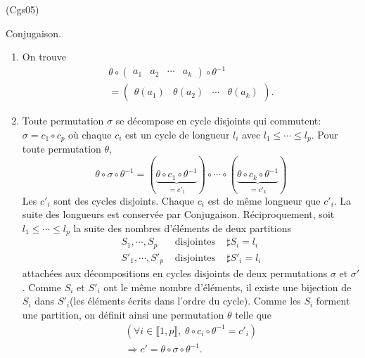 \begin{tiny}(Cgs05)\end{tiny} Conjugaison.
\begin{enumerate}
  \item On trouve 
\begin{multline*}
  \theta \circ 
\begin{pmatrix}
 a_{1} & a_{2} & \cdots & a_{k}
\end{pmatrix}
\circ \theta ^{-1}\\
=
\begin{pmatrix}
 \theta(a_{1}) & \theta(a_{2}) & \cdots & \theta(a_{k})
\end{pmatrix}
.
\end{multline*}

  \item Toute permutation $\sigma$ se décompose en cycle disjoints qui commutent: $\sigma = c_1 \circ c_p$ où chaque $c_i$ est un cycle de longueur $l_i$ avec $l_1 \leq \cdots \leq l_p$.\newline
  Pour toute permutation $\theta$,
\[
  \theta \circ \sigma \circ \theta^{-1}
  =
  (\underset{=c'_1}{\underbrace{\theta \circ c_1 \circ \theta^{-1}}})\circ \cdots 
  \circ (\underset{=c'_k}{\underbrace{\theta \circ c_k \circ \theta^{-1}}})
\]
Les $c'_i$ sont des cycles disjoints. Chaque $c_i$ est de même longueur que $c'_i$. La suite des longueurs est conservée par Conjugaison.\newline
Réciproquement, soit $l_1\leq \cdots \leq l_p$ la suite des nombres d'éléments de deux partitions
\[
  \begin{aligned}
    S_1, \cdots, S_p & \text{ disjointes } & \sharp S_i = l_i \\
    S'_1, \cdots, S'_p & \text{ disjointes } & \sharp S'_i = l_i 
  \end{aligned}
\]
attachées aux décompositions en cycles disjoints de deux permutations $\sigma$ et $\sigma'$. Comme $S_i$ et $S'_i$ ont le même nombre d'éléments, il existe une bijection de $S_i$ dans $S'_i$(les éléments écrits dans l'ordre du cycle). Comme les $S_i$ forment une partition, on définit ainsi une permutation $\theta$ telle que 
\begin{multline*}
  \left(\forall i \in \llbracket 1, p \rrbracket, \; \theta \circ c_i \circ \theta^{- 1}
  = c'_i\right)\\
  \Rightarrow 
  c' = \theta \circ \sigma \circ \theta^{-1}.
\end{multline*}


\end{enumerate}
